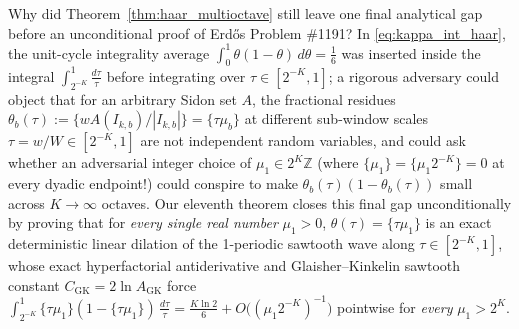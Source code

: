 \documentclass[11pt,reqno]{amsart}
\theoremstyle{definition}
\theoremstyle{remark}
\begin{document}
Why did Theorem~\ref{thm:haar_multioctave} still leave one final analytical gap before an unconditional proof of Erd\H{o}s Problem \#1191? In \eqref{eq:kappa_int_haar}, the unit-cycle integrality average $\int_0^1 \theta(1 - \theta)\,d\theta = \frac{1}{6}$ was inserted inside the integral $\int_{2^{-K}}^1 \frac{d\tau}{\tau}$ before integrating over $\tau \in [2^{-K}, 1]$; a rigorous adversary could object that for an arbitrary Sidon set $A$, the fractional residues $\theta_b(\tau) := \{w A(I_{k,b}) / |I_{k,b}|\} = \{\tau \mu_b\}$ at different sub-window scales $\tau = w/W \in [2^{-K}, 1]$ are not independent random variables, and could ask whether an adversarial integer choice of $\mu_1 \in 2^K \mathbb{Z}$ (where $\{\mu_1\} = \{\mu_1 2^{-K}\} = 0$ at every dyadic endpoint!) could conspire to make $\theta_b(\tau)(1 - \theta_b(\tau))$ small across $K \to \infty$ octaves. Our eleventh theorem closes this final gap unconditionally by proving that for \emph{every single real number} $\mu_1 > 0$, $\theta(\tau) = \{\tau \mu_1\}$ is an exact deterministic linear dilation of the 1-periodic sawtooth wave along $\tau \in [2^{-K}, 1]$, whose exact hyperfactorial antiderivative and Glaisher--Kinkelin sawtooth constant $C_{\mathrm{GK}} = 2\ln A_{\mathrm{GK}}$ force $\int_{2^{-K}}^1 \{\tau \mu_1\}(1 - \{\tau \mu_1\})\,\frac{d\tau}{\tau} = \frac{K\ln 2}{6} + O\bigl((\mu_1 2^{-K})^{-1}\bigr)$ pointwise for \emph{every} $\mu_1 > 2^K$.
\end{document}
